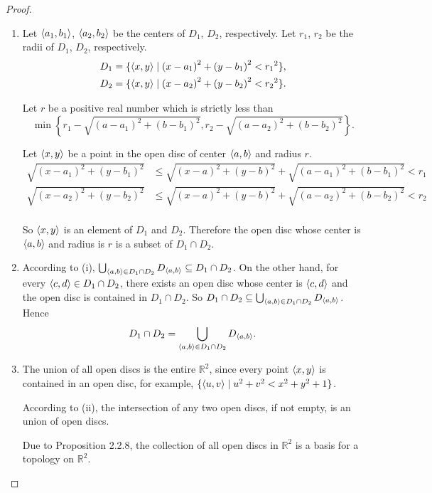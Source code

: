 \begin{proof}
	\begin{enumerate}[label={(\roman*)}]
		\item Let $\left\langle{a_{1}, b_{1}}\right\rangle$, $\left\langle{a_{2}, b_{2}}\right\rangle$ be the centers of $D_{1}$, $D_{2}$, respectively. Let $r_{1}$, $r_{2}$ be the radii of $D_{1}$, $D_{2}$, respectively.
		      \[
			      \begin{split}
				      D_{1} = \{ \left\langle{x, y}\right\rangle\mid {(x - a_{1})}^{2} + {(y - b_{1})}^{2} < {r_{1}}^{2} \}, \\
				      D_{2} = \{ \left\langle{x, y}\right\rangle\mid {(x - a_{2})}^{2} + {(y - b_{2})}^{2} < {r_{2}}^{2} \}.
			      \end{split}
		      \]

		      Let $r$ be a positive real number which is strictly less than
		      \[
			      \min\left\{ r_{1} - \sqrt{{(a-a_{1})}^{2} + {(b-b_{1})}^{2}}, r_{2} - \sqrt{{(a-a_{2})}^{2} + {(b-b_{2})}^{2}} \right\}.
		      \]

		      Let $\left\langle{x, y}\right\rangle$ be a point in the open disc of center $\left\langle{a, b}\right\rangle$ and radius $r$.
		      \begin{align*}
			      \sqrt{{(x-a_{1})}^{2} + {(y-b_{1})}^{2}} & \leq \sqrt{{(x-a)}^{2} + {(y-b)}^{2}} + \sqrt{{(a-a_{1})}^{2} + {(b-b_{1})}^{2}} < r_{1} \\
			      \sqrt{{(x-a_{2})}^{2} + {(y-b_{2})}^{2}} & \leq \sqrt{{(x-a)}^{2} + {(y-b)}^{2}} + \sqrt{{(a-a_{2})}^{2} + {(b-b_{2})}^{2}} < r_{2} \\
		      \end{align*}

		      So $\left\langle{x, y}\right\rangle$ is an element of $D_{1}$ and $D_{2}$. Therefore the open disc whose center is $\left\langle{a, b}\right\rangle$ and radius is $r$ is a subset of $D_{1}\cap D_{2}$.
		\item According to (i), $\bigcup_{\left\langle{a, b}\right\rangle\in D_{1}\cap D_{2}} D_{\left\langle{a, b}\right\rangle}\subseteq D_{1}\cap D_{2}$. On the other hand, for every $\left\langle{c, d}\right\rangle\in D_{1}\cap D_{2}$, there exists an open disc whose center is $\left\langle{c, d}\right\rangle$ and the open disc is contained in $D_{1}\cap D_{2}$. So $D_{1}\cap D_{2}\subseteq \bigcup_{\left\langle{a, b}\right\rangle\in D_{1}\cap D_{2}} D_{\left\langle{a, b}\right\rangle}$. Hence
		      \[
			      D_{1}\cap D_{2} = \bigcup_{\left\langle{a, b}\right\rangle\in D_{1}\cap D_{2}} D_{\left\langle{a, b}\right\rangle}.
		      \]
		\item The union of all open discs is the entire $\mathbb{R}^{2}$, since every point $\left\langle{x, y}\right\rangle$ is contained in an open disc, for example, $\{ \left\langle{u, v}\right\rangle \mid u^{2} + v^{2} < x^{2} + y^{2} + 1 \}$.

		      According to (ii), the intersection of any two open discs, if not empty, is an union of open discs.

		      Due to Proposition 2.2.8, the collection of all open discs in $\mathbb{R}^{2}$ is a basis for a topology on $\mathbb{R}^{2}$.
	\end{enumerate}
\end{proof}
\newpage


